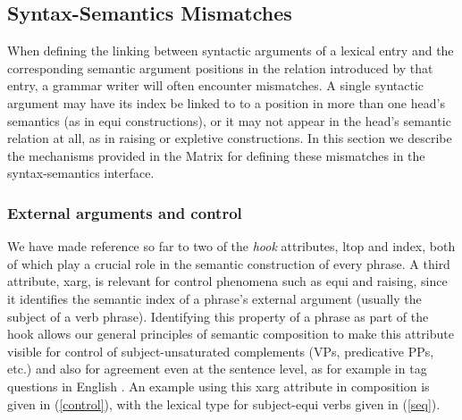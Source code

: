 \documentclass[12pt]{article}
\begin{document}

\subsection{Syntax-Semantics Mismatches}
\label{xargsec}

When defining the linking between syntactic arguments of a lexical entry
and the corresponding semantic argument positions in the relation introduced
by that entry, a grammar writer will often encounter mismatches.  A single
syntactic argument may have its index be linked to 
to a position in more than one head's semantics
(as in equi constructions), or it may not appear in
the head's semantic relation at all, as in raising or expletive constructions.
In this section we describe the mechanisms provided in the Matrix for 
defining these mismatches in the syntax-semantics interface.

\subsubsection{External arguments and control}

We have made reference so far to two of the {\it hook} attributes,
{\sc ltop} and {\sc index}, both of which play a crucial role in the semantic
construction of every phrase.  A third attribute, {\sc xarg}, is relevant for
control phenomena such as equi and raising, since it identifies the semantic
index of a phrase's external argument (usually the subject of a verb phrase).
Identifying this property of a phrase as part of the hook allows our general
principles of semantic composition to make this attribute visible for control
of subject-unsaturated complements (VPs, predicative PPs, etc.) and also for
agreement even at the sentence level, as for example in tag questions in
English \cite{Ben:Fli:99}.  An example using this {\sc xarg}
attribute in composition is given in (\ref{control}), with the lexical type
for subject-equi verbs given in (\ref{seq}).
\end{document}
